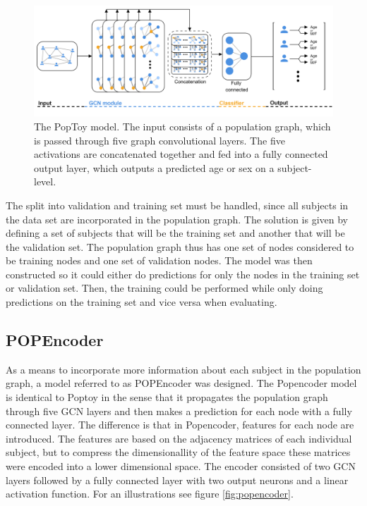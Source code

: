 \begin{figure}[H]
    \centering
    \includegraphics[width=\textwidth]{chapters/images_methods/poptoy_v2.png}
    \caption{The PopToy model. The input consists of a population graph, which is passed through five graph convolutional layers. The five activations are concatenated together and fed into a fully connected output layer, which outputs a predicted age or sex on a subject-level.}
    \label{fig:poptoy}
\end{figure}

 The split into validation and training set must be handled, since all subjects in the data set are incorporated in the population graph. The solution is given by defining a set of subjects that will be the training set and another that will be the validation set. The population graph thus has one set of nodes considered to be training nodes and one set of validation nodes. The model was then constructed so it could either do predictions for only the nodes in the training set or validation set. Then, the training could be performed while only doing predictions on the training set and vice versa when evaluating.

\subsection{POPEncoder}
As a means to incorporate more information about each subject in the population graph, a model referred to as POPEncoder was designed. The Popencoder model is identical to Poptoy in the sense that it propagates the population graph through five GCN layers and then makes a prediction for each node with a fully connected layer. The difference is that in Popencoder, features for each node are introduced. The features are based on the adjacency matrices of each individual subject, but to compress the dimensionallity of the feature space these matrices were encoded into a lower dimensional space. The encoder consisted of two GCN layers followed by a fully connected layer with two output neurons and a linear activation function. For an illustrations see figure \ref{fig:popencoder}.

